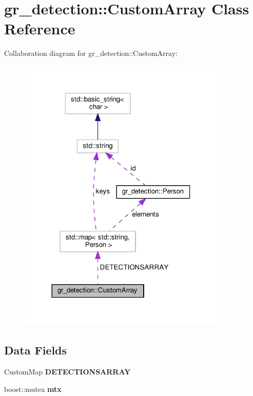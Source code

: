 \hypertarget{classgr__detection_1_1CustomArray}{}\section{gr\+\_\+detection\+:\+:Custom\+Array Class Reference}
\label{classgr__detection_1_1CustomArray}


Collaboration diagram for gr\+\_\+detection\+:\+:Custom\+Array\+:
\nopagebreak
\begin{figure}[H]
\begin{center}
\leavevmode
\includegraphics[width=282pt]{classgr__detection_1_1CustomArray__coll__graph}
\end{center}
\end{figure}
\subsection*{Data Fields}
\begin{DoxyCompactItemize}
\item 
\mbox{\label{classgr__detection_1_1CustomArray_ac5aeada88f8bcd2bc850d60f5b4effe8}} 
Custom\+Map {\bfseries D\+E\+T\+E\+C\+T\+I\+O\+N\+S\+A\+R\+R\+AY}
\item 
\mbox{\label{classgr__detection_1_1CustomArray_a9e581ac6b992c989e4f12b531acfef8d}} 
boost\+::mutex {\bfseries mtx}
\end{DoxyCompactItemize}


